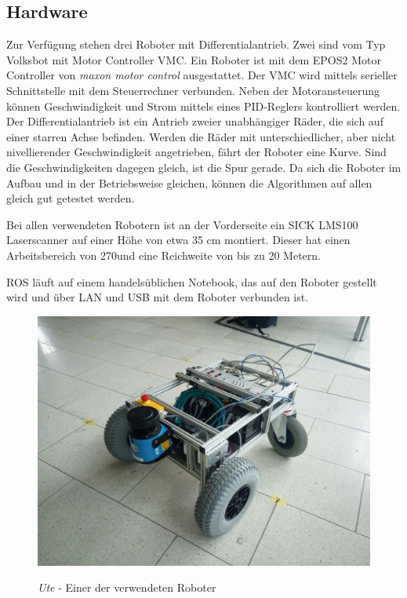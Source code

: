 \documentclass[11pt,a4paper]{article}
\begin{document}
{\subsection{Hardware}
 
	Zur Verf\"ugung stehen drei Roboter mit Differentialantrieb. Zwei sind vom Typ Volksbot mit Motor Controller VMC. Ein Roboter ist mit dem EPOS2 Motor Controller von \textit{maxon motor control} ausgestattet. Der VMC \cite{Volksbot} wird mittels serieller Schnittstelle mit dem Steuerrechner verbunden. Neben der Motoransteuerung k\"onnen Geschwindigkeit und Strom mittels eines PID-Reglers kontrolliert werden. Der 
	Differentialantrieb ist ein Antrieb zweier unabh\"angiger R\"ader, die sich auf einer starren Achse befinden. Werden die R\"ader mit unterschiedlicher, aber nicht nivellierender Geschwindigkeit angetrieben, f\"ahrt der Roboter eine Kurve. Sind die Geschwindigkeiten dagegen gleich, ist die Spur gerade.
	Da sich die Roboter im Aufbau und in der Betriebsweise gleichen, k\"onnen die Algorithmen auf allen gleich gut getestet werden.

	Bei allen verwendeten Robotern ist an der Vorderseite ein SICK LMS100 Laserscanner auf einer H\"ohe von etwa 35 cm montiert. Dieser hat einen Arbeitsbereich von 270\degree  und eine Reichweite von bis zu 20 Metern.\cite{lms} 
 
	ROS l\"auft auf einem handels\"ublichen Notebook, das auf den Roboter gestellt wird und \"uber LAN und USB mit dem Roboter verbunden ist. 
 

\begin{figure}[h]
	\centering
	{\includegraphics[trim= 2cm 2cm 2cm 2cm, clip=true,width=\linewidth]{pictures/robot.jpg}}
	\caption{\textit{Ute} - Einer der verwendeten Roboter}
\end{figure}


}
\end{document}

